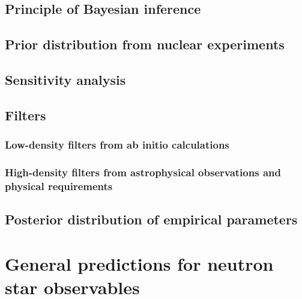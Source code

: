 \subsection{Principle of Bayesian inference} %


\subsection{Prior distribution from nuclear experiments} %

\subsection{Sensitivity analysis} %

\subsection{Filters} %

\subsubsection{Low-density filters from ab initio calculations} %


\subsubsection{High-density filters from astrophysical observations and 
physical requirements} %


\subsection{Posterior distribution of empirical parameters} %


\section{General predictions for neutron star observables} %

